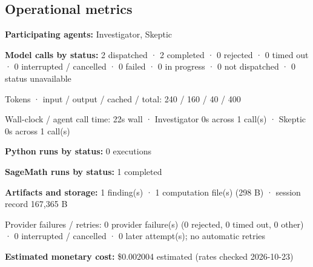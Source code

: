 \documentclass[11pt]{article}
\begin{document}
\subsection{Operational metrics}
\textbf{Participating agents:} Investigator, Skeptic\par
\textbf{Model calls by status:} 2 dispatched · 2 completed · 0 rejected · 0 timed out · 0 interrupted / cancelled · 0 failed · 0 in progress · 0 not dispatched · 0 status unavailable\par
Tokens · input / output / cached / total: 240 / 160 / 40 / 400\par
Wall-clock / agent call time: 22s wall · Investigator 0s across 1 call(s) · Skeptic 0s across 1 call(s)\par
\textbf{Python runs by status:} 0 executions\par
\textbf{SageMath runs by status:} 1 completed\par
\textbf{Artifacts and storage:} 1 finding(s) · 1 computation file(s) (298 B) · session record 167,365 B\par
Provider failures / retries: 0 provider failure(s) (0 rejected, 0 timed out, 0 other) · 0 interrupted / cancelled · 0 later attempt(s); no automatic retries\par
\textbf{Estimated monetary cost:} \$0.002004 estimated (rates checked 2026-10-23)\par
\end{document}
